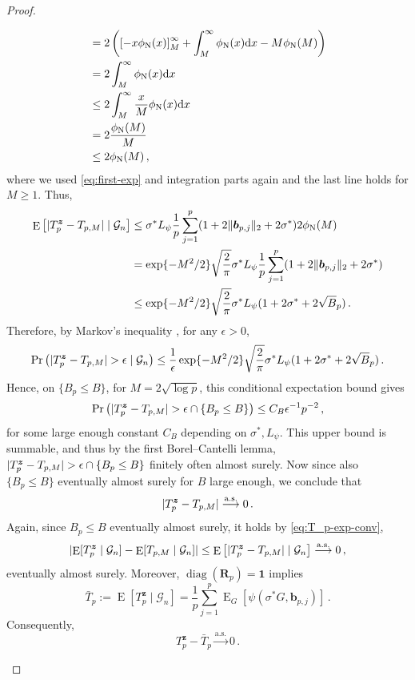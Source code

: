 \documentclass{article}
\makeatletter
\DeclareMathOperator{\expect}{E}
\DeclareMathOperator{\diag}{diag}
\theoremstyle{definition}
\newcommand{\vnorm}[1]{%
	\ensuremath{%
		\if@display
		\left\| #1 \right\|
		\else
		\| #1 \|
		\fi
	}%
}
\newcommand{\abs}[1]{%
	\ensuremath{%
		\if@display
		\left| #1 \right|
		\else
		\lvert #1 \rvert
		\fi
	}%
}
\newcommand*{\bb}{\boldsymbol}
\makeatother
\begin{document}
\begin{bibunit}
\begin{proof}
\begin{enumerate}[label=(\roman{*})]
\begin{equation}
\begin{aligned}
        &= 2 \left(\left[-x \phi_{\rm N}(x)\right]_M^\infty + \int_M^\infty  \phi_{\rm N}(x)  \mathrm{d}x  - M \phi_{\rm N}(M) \right) \\ 
        &= 2\int_M^\infty \phi_{\rm N}(x) \mathrm{d} x \\ 
        &\leq 2\int_M^\infty \frac{x}{M} \phi_{\rm N}(x) \mathrm{d} x \\ 
        &= 2\frac{\phi_{\rm N}(M)}{M} \\ 
        &\leq 2 \phi_{\rm N}(M) \,, 
    \end{aligned}
\end{equation}
where we used \eqref{eq:first-exp} and integration parts again and the last line holds for $M \geq 1$. Thus, 
\begin{equation}
        \label{eq:T_p-exp-conv}
        \begin{aligned}
        \expect\left[\abs{T_p^{\bb z}-T_{p,M}} \mid \mathcal G_n \right] &\leq \sigma^* L_\psi \frac{1}{p} \sum_{j = 1}^{p} (1 + 2 \vnorm{\bb b_{p,j}}_2 + 2 \sigma^*)2 \phi_{\rm N}(M) \\ 
        &= \exp\{-M^2/2 \} \sqrt{\frac{2}{\pi}} \sigma^* L_\psi \frac{1}{p} \sum_{j = 1}^{p} (1 + 2 \vnorm{\bb b_{p,j}}_2 + 2 \sigma^*)  \\  
        &\leq \exp\{-M^2/2 \} \sqrt{\frac{2}{\pi}} \sigma^* L_\psi (1 + 2 \sigma^* + 2 \sqrt B_p)  \,. 
    \end{aligned}
\end{equation}
Therefore, by Markov's inequality \citep[Proposition~1.2.4]{vershynin:2018}, for any $\epsilon > 0$, 
$$
    \Pr \left(\abs{T_p^{\bb z}-T_{p,M}} > \epsilon \mid \mathcal G_n \right) \leq \frac{1}{\epsilon} \exp\{-M^2/2 \} \sqrt{\frac{2}{\pi}} \sigma^* L_\psi (1 + 2 \sigma^* + 2 \sqrt B_p) \,.  
$$
Hence, on $\{B_p\leq B\}$, for $M = 2 \sqrt{\log p}$, this
conditional expectation bound gives
$$
    \Pr\left(\abs{T_p^{\bb z}-T_{p,M}} > \epsilon \cap \{B_p \leq B \} \right) \leq C_B \epsilon^{-1} p^{-2} \,, 
$$
for some large enough constant $C_B$ depending on $\sigma^*, L_\psi$. This upper bound is summable, and thus by the first Borel--Cantelli lemma, 
$\abs{T_p^{\bb z}-T_{p,M}} > \epsilon \cap \{B_p \leq B \}$ finitely often almost surely. Now since also $\{ B_p \leq B \}$ eventually almost surely for $B$ large enough, 
we conclude that 
$$
    \abs{T_p^{\bb z} - T_{p,M}} \overset{\mathrm{a.s.}}{\longrightarrow} 0 \,. 
$$
Again, since $B_p\leq B$ eventually almost surely, it holds by \eqref{eq:T_p-exp-conv}, 
$$
    \abs{\expect[T_p^{\bb z}\mid\mathcal G_n]
    -
    \expect[T_{p,M}\mid\mathcal G_n]} \leq \expect\left[\abs{T_p^{\bb z} - T_{p,M}} \mid \mathcal G_n\right] \overset{\mathrm{a.s.}}{\longrightarrow} 0 \,, 
$$
eventually almost surely. 
Moreover, $\diag(\bb R_p)=\bb1$ implies
$$
    \bar T_p
    :=
    \expect[T_p^{\bb z}\mid\mathcal G_n]
    =
    \frac1p
    \sum_{j=1}^p
    \expect_G
    \left[
        \psi(\sigma^*G,\bb b_{p,j})
    \right]\,.
$$
Consequently,
$$
    T_p^{\bb z}
    -
    \bar T_p
    \overset{\mathrm{a.s.}}{\longrightarrow}
    0\,.
$$


\end{enumerate}
\end{proof}
\end{bibunit}
\end{document}
